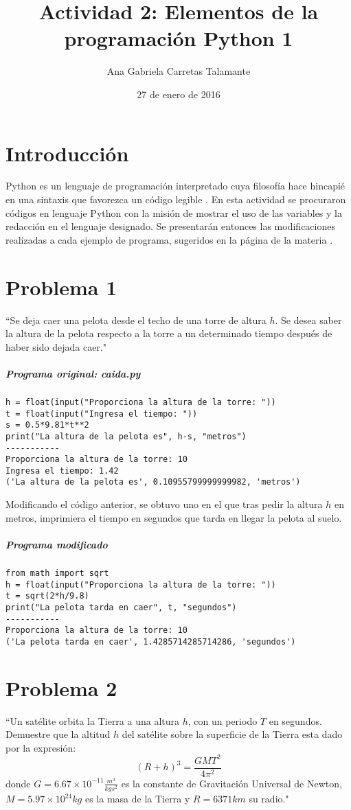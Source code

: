 \documentclass[12pt]{article}
\title{Actividad 2: Elementos de la programación Python 1}
\author{Ana Gabriela Carretas Talamante}
\date{27 de enero de 2016}
\begin{document}
\maketitle
\section{Introducción}
Python es un lenguaje de programación interpretado cuya filosofía hace hincapié en una sintaxis que favorezca un código legible \cite{1}. En esta actividad se procuraron códigos en lenguaje Python con la misión de mostrar el uso de las variables y la redacción en el lenguaje designado. Se presentarán entonces las modificaciones realizadas a cada ejemplo de programa, sugeridos en la página de la materia \cite{2}.

\section{Problema 1}
``Se deja caer una pelota desde el techo de una torre de altura $h$. Se desea saber la altura de la pelota respecto a la torre a un determinado tiempo después de haber sido dejada caer."

\subparagraph*{Programa original: caida.py}
\begin{verbatim}
h = float(input("Proporciona la altura de la torre: "))
t = float(input("Ingresa el tiempo: "))
s = 0.5*9.81*t**2
print("La altura de la pelota es", h-s, "metros")
-----------
Proporciona la altura de la torre: 10
Ingresa el tiempo: 1.42
('La altura de la pelota es', 0.10955799999999982, 'metros')
\end{verbatim}

Modificando el código anterior, se obtuvo uno en el que tras pedir la altura $h$ en metros, imprimiera el tiempo en segundos que tarda en llegar la pelota al suelo.

\subparagraph*{Programa modificado}
\begin{verbatim}
from math import sqrt
h = float(input("Proporciona la altura de la torre: "))
t = sqrt(2*h/9.8)
print("La pelota tarda en caer", t, "segundos")
-----------
Proporciona la altura de la torre: 10
('La pelota tarda en caer', 1.4285714285714286, 'segundos')
\end{verbatim}

\section{Problema 2}
``Un satélite orbita la Tierra a una altura $h$, con un periodo $T$ en segundos. Demuestre que la altitud $h$ del satélite sobre la superficie de la Tierra esta dado por la expresión:
\begin{equation} \label{1}
(R+h)^3=\frac{GMT^2}{4\pi^2}
\end{equation}
donde $G=6.67 \times 10^{-11} \frac{m^3}{kg s^2}$ es la constante de Gravitación Universal de Newton, $M=5.97 \times 10^{24} kg$ es la masa de la Tierra y $R=6371 km$ su radio."
\end{document}
